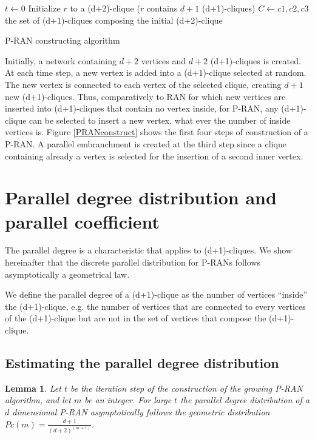 \documentclass[11pt]{iopart}
\newtheorem{lemma}[theorem]{Lemma}
\newenvironment{definition}[1][Definition]{\begin{trivlist}
    \item[\hskip \labelsep {\bfseries #1}]}{\end{trivlist}}
\begin{document}
\begin{algorithm}[H]
  \SetLine
  
  $t \leftarrow 0$\;
  Initialize $r$ to a (d+2)-clique ($r$ contains $d+1$ (d+1)-cliques)\; 
  $C \leftarrow {c1, c2, c3}$ the set of (d+1)-cliques composing the initial (d+2)-clique \;
  \caption{P-RAN constructing algorithm}
  \label{P-RANAlgo}
\end{algorithm}

Initially, a network containing $d+2$ vertices and  $d+2$ (d+1)-cliques is created.
At each time step, a new vertex is added into a (d+1)-clique selected at random. The new vertex is connected to each vertex of the selected clique, creating $d+1$ new (d+1)-cliques. Thus, comparatively to RAN for which new vertices are inserted into (d+1)-cliques that contain no vertex inside, for P-RAN, any (d+1)-clique can be selected to insert a new vertex, what ever the number of inside vertices is.
Figure \ref{PRANconstruct} shows the first four steps of construction of a P-RAN. A parallel embranchment is created at the third step since a clique containing already a vertex is selected for the insertion of a second inner vertex.


\section{Parallel degree distribution and parallel coefficient}
\label{Parallel degree distribution}

The parallel degree is a characteristic that applies to (d+1)-cliques. We show hereinafter that the discrete parallel distribution for P-RANs follows asymptotically a geometrical law.

\begin{definition}
We define the parallel degree of a (d+1)-clique as the number of vertices ``inside'' the (d+1)-clique, e.g. the number of vertices that are  connected to every vertices of the (d+1)-clique but are not in the set of vertices that compose the (d+1)-clique. 
\end{definition}

\subsection{Estimating the parallel degree distribution}
\begin{lemma}
\label{ParallelDegreeLemma}
Let $t$ be the iteration step of the construction of the growing P-RAN algorithm, and let $m$ be an integer. For large $t$ the parallel degree distribution of a $d$ dimensional P-RAN asymptotically follows the geometric distribution $Pc(m)=\frac{d+1}{(d+2)^{(m+1)}}$.
\end{lemma}
\end{document}
